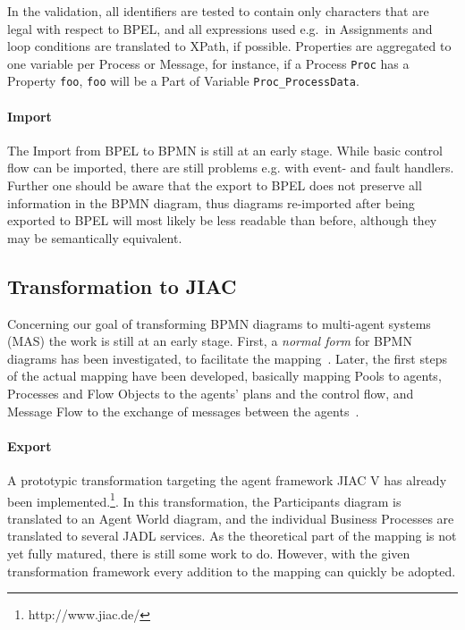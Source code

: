 In the validation, all identifiers are tested to contain only characters that are legal with respect to BPEL, and all expressions used e.g.\ in Assignments and loop conditions are translated to XPath, if possible.  Properties are aggregated to one variable per Process or Message, for instance, if a Process \texttt{Proc} has a Property \texttt{foo}, \texttt{foo} will be a Part of Variable \texttt{Proc\_ProcessData}.

\paragraph{Import}
The Import from BPEL to BPMN is still at an early stage. While basic control flow can be imported, there are still problems e.g. with event- and fault handlers.  Further one should be aware that the export to BPEL does not preserve all information in the BPMN diagram, thus diagrams re-imported after being exported to BPEL will most likely be less readable than before, although they may be semantically equivalent.


\subsection{Transformation to JIAC}
\label{sec:user_trafo_jiac}

Concerning our goal of transforming BPMN diagrams to multi-agent systems (MAS) the work is still at an early stage.  First, a \emph{normal form} for BPMN diagrams has been investigated, to facilitate the mapping~\cite{endert2007towards}.  Later, the first steps of the actual mapping have been developed, basically mapping Pools to agents, Processes and Flow Objects to the agents' plans and the control flow, and Message Flow to the exchange of messages between the agents~\cite{endert2007mapping}.

\paragraph{Export}
A prototypic transformation targeting the agent framework JIAC V has already been implemented.\footnote{http://www.jiac.de/}.  In this transformation, the Participants diagram is translated to an Agent World diagram, and the individual Business Processes are translated to several JADL services.  As the theoretical part of the mapping is not yet fully matured, there is still some work to do.  However, with the given transformation framework every addition to the mapping can quickly be adopted.

